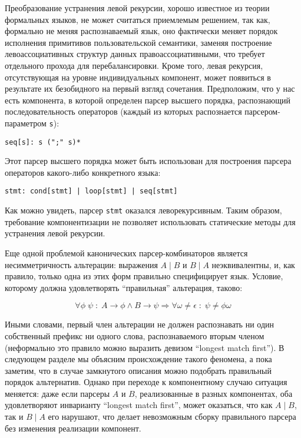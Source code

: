 \documentclass[conference]{IEEEtran}
\begin{document}
Преобразование устранения левой рекурсии, хорошо известное из теории формальных языков, не может считаться приемлемым решением, так как,
формально не меняя распознаваемый язык, оно фактически меняет порядок исполнения примитивов пользовательской семантики, заменяя
построение левоассоциативных структур данных правоассоциативными, что требует отдельного прохода для перебалансировки. Кроме того,
левая рекурсия, отсутствующая на уровне индивидуальных компонент, может появиться в результате их безобидного на первый взгляд сочетания.
Предположим, что у нас есть компонента, в которой определен парсер высшего порядка, распознающий последовательность операторов (каждый из которых
распознается парсером-параметром \lstinline|s|):

\begin{lstlisting}[basicstyle=\small]
  seq[s]: s (";" s)*
\end{lstlisting}

Этот парсер высшего порядка может быть использован для построения парсера операторов какого-либо конкретного языка:

\begin{lstlisting}[basicstyle=\small]
  stmt: cond[stmt] | loop[stmt] | seq[stmt]
\end{lstlisting}

Как можно увидеть, парсер \lstinline|stmt| оказался леворекурсивным. Таким образом, требование компонентизации не позволяет
использовать статические методы для устранения левой рекурсии.

Еще одной проблемой канонических парсер-комбинаторов является несимметричность альтерации: выражения $A \mid B$ и $B\mid A$
неэквивалентны, и, как правило, только одна из этих форм правильно специфицирует язык. Условие, которому должна удовлетворять
``правильная'' альтерация, таково:

\[
\forall\phi\;\psi\;:\; A\rightarrow\phi \wedge B\rightarrow\psi \Rightarrow \forall\omega\ne\epsilon\;:\;\psi\ne\phi\omega
\]  

Иными словами, первый член альтерации не должен распознавать ни один собственный префикс ни одного слова, распознаваемого
вторым членом (неформально это правило можно выразить девизом ``longest match first''). В следующем разделе мы объясним происхождение такого феномена,
а пока заметим, что в случае замкнутого описания можно подобрать правильный порядок альтернатив. Однако при переходе к компонентному случаю
ситуация меняется: даже если парсеры $A$ и $B$, реализованные в разных компонентах, оба удовлетворяют инварианту ``longest match first'', может оказаться,
что как $A\mid B$, так и $B\mid A$ его нарушают, что делает невозможным сборку правильного парсера без изменения реализации компонент.
\end{document}

